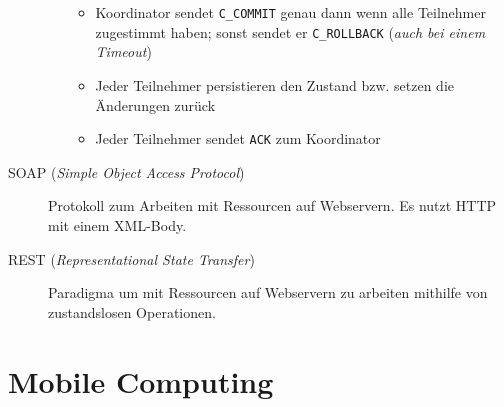 \documentclass[a4paper]{article}
\begin{document}
\begin{description}
\begin{samepage}
\begin{enumerate}
        \begin{itemize}
            \item Koordinator sendet \texttt{C\_COMMIT} genau dann wenn alle Teilnehmer zugestimmt haben; sonst sendet er \texttt{C\_ROLLBACK} (\textit{auch bei einem Timeout})
            \item Jeder Teilnehmer persistieren den Zustand bzw. setzen die Änderungen zurück
            \item Jeder Teilnehmer sendet \texttt{ACK} zum Koordinator
        \end{itemize}
    \end{enumerate}
    \end{samepage}
    \item[SOAP (\textit{Simple Object Access Protocol})] Protokoll zum Arbeiten mit Ressourcen auf Webservern. Es nutzt HTTP mit einem XML-Body.
    \item[REST (\textit{Representational State Transfer})] Paradigma um mit Ressourcen auf Webservern zu arbeiten mithilfe von zustandslosen Operationen.
\end{description}

\section{Mobile Computing}
\end{document}
